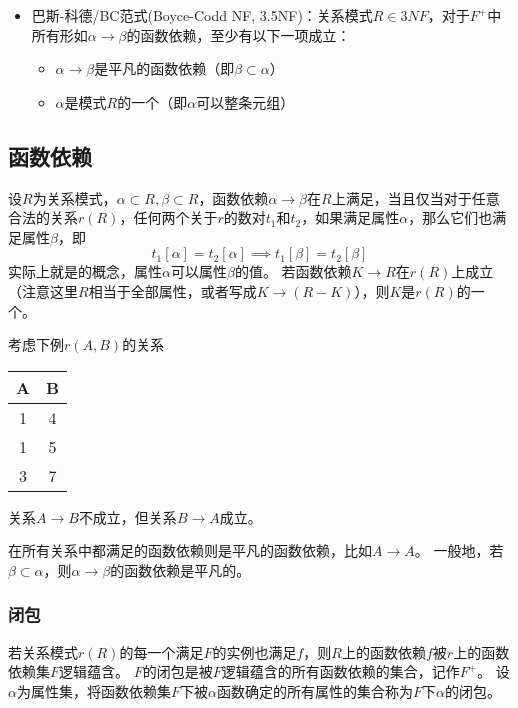 \begin{itemize}
	\item 巴斯-科德/BC范式(Boyce-Codd NF, 3.5NF)：关系模式$R\in 3NF$，对于$F^+$中所有形如$\alpha\to\beta$的函数依赖，至少有以下一项成立：
	\begin{itemize}
		\item $\alpha\to\beta$是平凡的函数依赖（即$\beta\subset\alpha$）
		\item $\alpha$是模式$R$的一个（即$\alpha$可以整条元组）
	\end{itemize}
\end{itemize}

\subsection{函数依赖}
\begin{definition}
设$R$为关系模式，$\alpha\subset R,\beta\subset R$，函数依赖$\alpha\to\beta$在$R$上满足，当且仅当对于任意合法的关系$r(R)$，任何两个关于$r$的数对$t_1$和$t_2$，如果满足属性$\alpha$，那么它们也满足属性$\beta$，即
\[t_1[\alpha]=t_2[\alpha]\implies t_1[\beta]=t_2[\beta]\]
实际上就是的概念，属性$\alpha$可以属性$\beta$的值。
若函数依赖$K\to R$在$r(R)$上成立（注意这里$R$相当于全部属性，或者写成$K\to (R-K)$），则$K$是$r(R)$的一个。
\end{definition}
\begin{example}
考虑下例$r(A,B)$的关系
\begin{center}
\begin{tabular}{|c|c|}\hline
A & B\\\hline
1 & 4\\\hline
1 & 5\\\hline
3 & 7\\\hline
\end{tabular}
\end{center}
关系$A\to B$不成立，但关系$B\to A$成立。
\end{example}

\begin{definition}[平凡]
在所有关系中都满足的函数依赖则是平凡的函数依赖，比如$A\to A$。
一般地，若$\beta\subset\alpha$，则$\alpha\to\beta$的函数依赖是平凡的。
\end{definition}

\subsubsection{闭包}
\begin{definition}[逻辑蕴含与闭包]
若关系模式$r(R)$的每一个满足$F$的实例也满足$f$，则$R$上的函数依赖$f$被$r$上的函数依赖集$F$逻辑蕴含。
$F$的闭包是被$F$逻辑蕴含的所有函数依赖的集合，记作$F^+$。
设$\alpha$为属性集，将函数依赖集$F$下被$\alpha$函数确定的所有属性的集合称为$F$下$\alpha$的闭包。
\end{definition}

